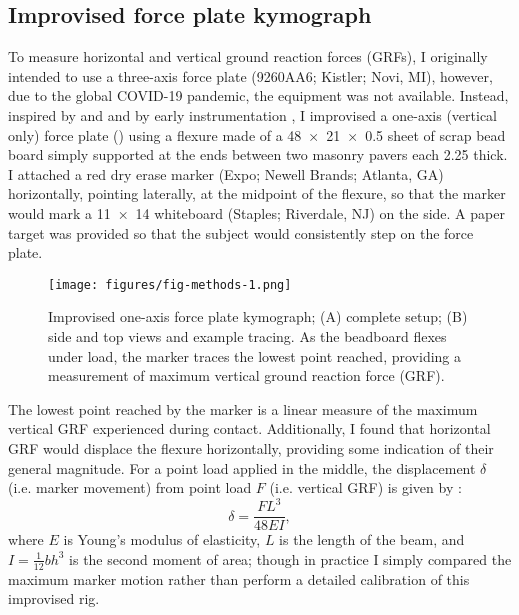 \subsection{Improvised force plate kymograph}
To measure horizontal and vertical ground reaction forces (GRFs), I originally intended to use a three-axis force plate (9260AA6; Kistler; Novi, MI), however, due to the global COVID-19 pandemic, the equipment was not available. Instead, inspired by \citet{denny1983simple} and \citet{bell1984quantifying} and by early instrumentation \citep{baker2007history, mayer2010physiological, marey1873locomotion, carlet1872essai}, I improvised a one-axis (vertical only) force plate () using a flexure made of a \SI{48 x 21 x 0.5}{\inch} sheet of scrap bead board simply supported at the ends between two masonry pavers each \SI{2.25}{\inch} thick. I attached a red dry erase marker (Expo; Newell Brands; Atlanta, GA) horizontally, pointing laterally, at the midpoint of the flexure, so that the marker would mark a \SI{11x14}{\inch} whiteboard (Staples; Riverdale, NJ) on the side. A paper target was provided so that the subject would consistently step on the force plate. 
\begin{figure}
\begin{center}
\texttt{[image: figures/fig-methods-1.png]}
\end{center}
\caption{Improvised one-axis force plate kymograph; (A) complete setup; (B) side and top views and example tracing. As the beadboard flexes under load, the marker traces the lowest point reached, providing a measurement of maximum vertical ground reaction force (GRF).}
\label{fig:methods:forceplate}
\end{figure}
The lowest point reached by the marker is a linear measure of the maximum vertical GRF experienced during contact. Additionally, I found that horizontal GRF would displace the flexure horizontally, providing some indication of their general magnitude. For a point load applied in the middle, the displacement $\delta$ (i.e. marker movement) from point load $F$ (i.e. vertical GRF) is given by \cite{craig2011mechanics}: 
\begin{equation}
\delta = \frac{FL^3}{48 EI},
\label{eq:sensor-response}
\end{equation}
where $E$ is Young's modulus of elasticity, $L$ is the length of the beam, and $I=\frac{1}{12}bh^3$ is the second moment of area; though in practice I simply compared the maximum marker motion rather than perform a detailed calibration of this improvised rig. 

